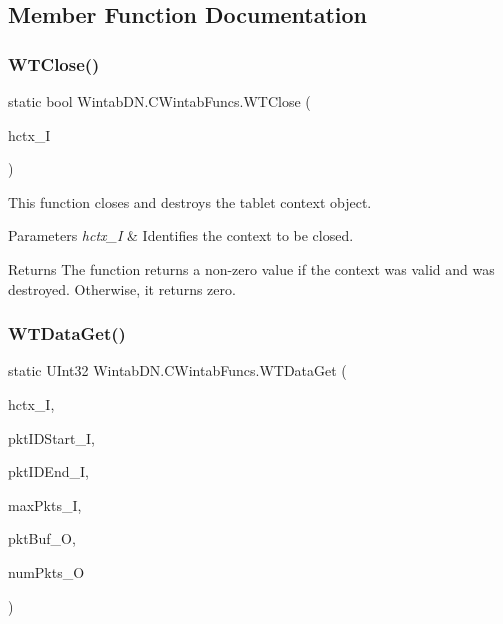 \subsection{Member Function Documentation}
\mbox{\label{class_wintab_d_n_1_1_c_wintab_funcs_a8d62228bbf3a89d2e215814ab8577c81}} 
\subsubsection{\texorpdfstring{W\+T\+Close()}{WTClose()}}
{\footnotesize\ttfamily static bool Wintab\+D\+N.\+C\+Wintab\+Funcs.\+W\+T\+Close (\begin{DoxyParamCaption}\item[{\mbox{\hyperlink{namespace_wintab_d_n_a9ae61204cd14d7ef23008991d1fb6dff}{P\+\_\+\+H\+C\+TX}}}]{hctx\+\_\+I }\end{DoxyParamCaption})}



This function closes and destroys the tablet context object. 


\begin{DoxyParams}{Parameters}
{\em hctx\+\_\+I} & Identifies the context to be closed.\\
\hline
\end{DoxyParams}
\begin{DoxyReturn}{Returns}
The function returns a non-\/zero value if the context was valid and was destroyed. Otherwise, it returns zero.
\end{DoxyReturn}
\mbox{\label{class_wintab_d_n_1_1_c_wintab_funcs_a95fc57793075f5982e0e8112d196c778}} 
\subsubsection{\texorpdfstring{W\+T\+Data\+Get()}{WTDataGet()}}
{\footnotesize\ttfamily static U\+Int32 Wintab\+D\+N.\+C\+Wintab\+Funcs.\+W\+T\+Data\+Get (\begin{DoxyParamCaption}\item[{\mbox{\hyperlink{namespace_wintab_d_n_a9ae61204cd14d7ef23008991d1fb6dff}{P\+\_\+\+H\+C\+TX}}}]{hctx\+\_\+I,  }\item[{U\+Int32}]{pkt\+I\+D\+Start\+\_\+I,  }\item[{U\+Int32}]{pkt\+I\+D\+End\+\_\+I,  }\item[{U\+Int32}]{max\+Pkts\+\_\+I,  }\item[{Int\+Ptr}]{pkt\+Buf\+\_\+O,  }\item[{ref U\+Int32}]{num\+Pkts\+\_\+O }\end{DoxyParamCaption})}



